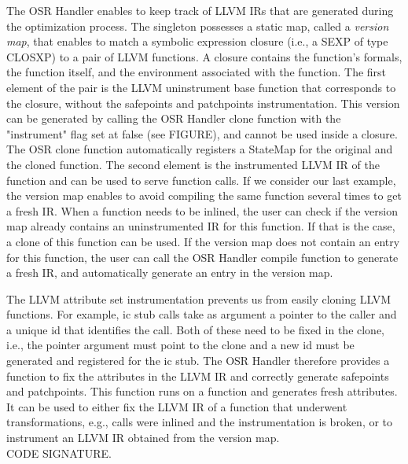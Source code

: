 The OSR Handler enables to keep track of LLVM IRs that are generated during the optimization process.
The singleton possesses a static map, called a \textit{version map}, that enables to match a symbolic expression closure (i.e., a SEXP of type CLOSXP) to a pair of LLVM functions\cite{llvmFunction}.
A closure contains the function's formals, the function itself, and the environment associated with the function.
The first element of the pair is the LLVM uninstrument base function that corresponds to the closure, without the safepoints and patchpoints instrumentation.
This version can be generated by calling the OSR Handler clone function with the "instrument" flag set at false (see FIGURE), and cannot be used inside a closure.
The OSR clone function automatically registers a StateMap for the original and the cloned function.
The second element is the instrumented LLVM IR of the function and can be used to serve function calls.
If we consider our last example, the version map enables to avoid compiling the same function several times to get a fresh IR. 
When a function needs to be inlined, the user can check if the version map already contains an uninstrumented IR for this function. 
If that is the case, a clone of this function can be used. 
If the version map does not contain an entry for this function, the user can call the OSR Handler compile function to generate a fresh IR, and automatically generate an entry in the version map.\\


The LLVM attribute set instrumentation prevents us from easily cloning LLVM functions.
For example, ic stub calls take as argument a pointer to the caller and a unique id that identifies the call.
Both of these need to be fixed in the clone, i.e., the pointer argument must point to the clone and a new id must be generated and registered for the ic stub.
The OSR Handler therefore provides a function to fix the attributes in the LLVM IR and correctly generate safepoints and patchpoints.
This function runs on a function and generates fresh attributes. 
It can be used to either fix the LLVM IR of a function that underwent transformations, e.g., calls were inlined and the instrumentation is broken, or to instrument an LLVM IR obtained from the version map.\\

CODE SIGNATURE.

